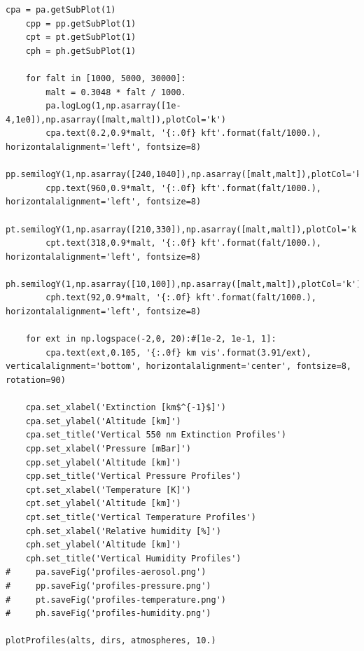 \documentclass{workpackage}
\begin{document}
\begin{lstlisting}[style=incellstyle,caption={Code Listing in cell 15 \label{lst:autolistingcell15}}]
    cpa = pa.getSubPlot(1)
    cpp = pp.getSubPlot(1)
    cpt = pt.getSubPlot(1)
    cph = ph.getSubPlot(1)
    
    for falt in [1000, 5000, 30000]:
        malt = 0.3048 * falt / 1000.
        pa.logLog(1,np.asarray([1e-4,1e0]),np.asarray([malt,malt]),plotCol='k')
        cpa.text(0.2,0.9*malt, '{:.0f} kft'.format(falt/1000.), horizontalalignment='left', fontsize=8)    
        pp.semilogY(1,np.asarray([240,1040]),np.asarray([malt,malt]),plotCol='k')
        cpp.text(960,0.9*malt, '{:.0f} kft'.format(falt/1000.), horizontalalignment='left', fontsize=8)    
        pt.semilogY(1,np.asarray([210,330]),np.asarray([malt,malt]),plotCol='k')
        cpt.text(318,0.9*malt, '{:.0f} kft'.format(falt/1000.), horizontalalignment='left', fontsize=8)    
        ph.semilogY(1,np.asarray([10,100]),np.asarray([malt,malt]),plotCol='k')
        cph.text(92,0.9*malt, '{:.0f} kft'.format(falt/1000.), horizontalalignment='left', fontsize=8)    

    for ext in np.logspace(-2,0, 20):#[1e-2, 1e-1, 1]:
        cpa.text(ext,0.105, '{:.0f} km vis'.format(3.91/ext), verticalalignment='bottom', horizontalalignment='center', fontsize=8, rotation=90)        
        
    cpa.set_xlabel('Extinction [km$^{-1}$]')
    cpa.set_ylabel('Altitude [km]')
    cpa.set_title('Vertical 550 nm Extinction Profiles')
    cpp.set_xlabel('Pressure [mBar]')
    cpp.set_ylabel('Altitude [km]')
    cpp.set_title('Vertical Pressure Profiles')
    cpt.set_xlabel('Temperature [K]')
    cpt.set_ylabel('Altitude [km]')
    cpt.set_title('Vertical Temperature Profiles')
    cph.set_xlabel('Relative humidity [%]')
    cph.set_ylabel('Altitude [km]')
    cph.set_title('Vertical Humidity Profiles')
#     pa.saveFig('profiles-aerosol.png')
#     pp.saveFig('profiles-pressure.png')
#     pt.saveFig('profiles-temperature.png')
#     ph.saveFig('profiles-humidity.png')
    
plotProfiles(alts, dirs, atmospheres, 10.)    
\end{lstlisting}
\end{document}
